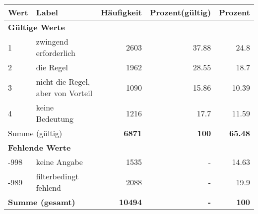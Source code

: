      \begin{longtable}{lXrrr}
     \toprule
     \textbf{Wert} & \textbf{Label} & \textbf{Häufigkeit} & \textbf{Prozent(gültig)} & \textbf{Prozent} \\
     \endhead
     \midrule
     \multicolumn{5}{l}{\textbf{Gültige Werte}}\\

     1 &
     \multicolumn{1}{X}{ zwingend erforderlich   } &


       \num{2603} &
       \num[round-mode=places,round-precision=2]{37.88} &
         \num[round-mode=places,round-precision=2]{24.8} \\

     2 &
     \multicolumn{1}{X}{ die Regel   } &


       \num{1962} &
       \num[round-mode=places,round-precision=2]{28.55} &
         \num[round-mode=places,round-precision=2]{18.7} \\

     3 &
     \multicolumn{1}{X}{ nicht die Regel, aber von Vorteil   } &


       \num{1090} &
       \num[round-mode=places,round-precision=2]{15.86} &
         \num[round-mode=places,round-precision=2]{10.39} \\

     4 &
     \multicolumn{1}{X}{ keine Bedeutung   } &


       \num{1216} &
       \num[round-mode=places,round-precision=2]{17.7} &
         \num[round-mode=places,round-precision=2]{11.59} \\
     \midrule
     \multicolumn{2}{l}{Summe (gültig)} &
       \textbf{\num{6871}} &
     \textbf{\num{100}} &
       \textbf{\num[round-mode=places,round-precision=2]{65.48}} \\
     \multicolumn{5}{l}{\textbf{Fehlende Werte}}\\
       -998 &
       keine Angabe &
         \num{1535} &
        - &
         \num[round-mode=places,round-precision=2]{14.63} \\
       -989 &
       filterbedingt fehlend &
         \num{2088} &
        - &
         \num[round-mode=places,round-precision=2]{19.9} \\
     \midrule
     \multicolumn{2}{l}{\textbf{Summe (gesamt)}} &
          \textbf{\num{10494}} &
        \textbf{-} &
        \textbf{\num{100}} \\
     \bottomrule
     \end{longtable}
     
